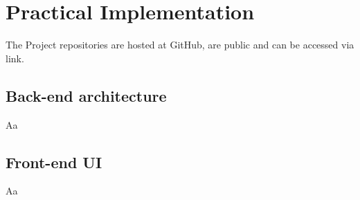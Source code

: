 \chapter{Practical Implementation}
The Project repositories are hosted at GitHub, are public and can be accessed via link.

\section{Back-end architecture}
Aa

\section{Front-end UI}
Aa
